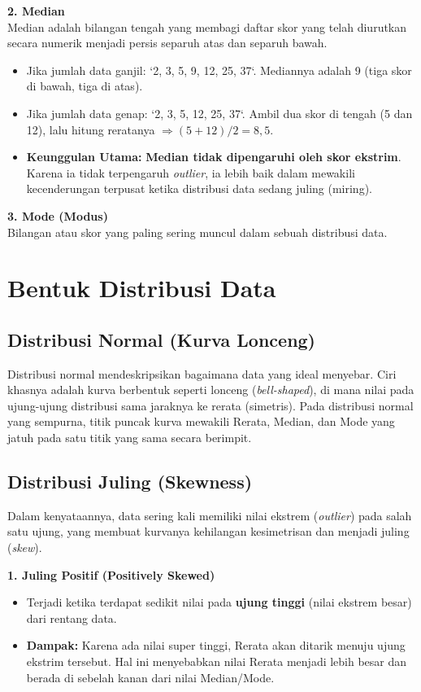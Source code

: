 \documentclass[12pt,a4paper]{article}
\begin{document}
\textbf{2. Median} \\
Median adalah bilangan tengah yang membagi daftar skor yang telah diurutkan secara numerik menjadi persis separuh atas dan separuh bawah.
\begin{itemize}
    \item Jika jumlah data ganjil: `2, 3, 5, 9, 12, 25, 37`. Mediannya adalah 9 (tiga skor di bawah, tiga di atas).
    \item Jika jumlah data genap: `2, 3, 5, 12, 25, 37`. Ambil dua skor di tengah (5 dan 12), lalu hitung reratanya $\Rightarrow (5+12)/2 = 8,5$.
    \item \textbf{Keunggulan Utama:} \textbf{Median tidak dipengaruhi oleh skor ekstrim}. Karena ia tidak terpengaruh \textit{outlier}, ia lebih baik dalam mewakili kecenderungan terpusat ketika distribusi data sedang juling (miring).
\end{itemize}

\textbf{3. Mode (Modus)} \\
Bilangan atau skor yang paling sering muncul dalam sebuah distribusi data.

\newpage
\section{Bentuk Distribusi Data}

\subsection{Distribusi Normal (Kurva Lonceng)}
Distribusi normal mendeskripsikan bagaimana data yang ideal menyebar. Ciri khasnya adalah kurva berbentuk seperti lonceng (\textit{bell-shaped}), di mana nilai pada ujung-ujung distribusi sama jaraknya ke rerata (simetris). Pada distribusi normal yang sempurna, titik puncak kurva mewakili Rerata, Median, dan Mode yang jatuh pada satu titik yang sama secara berimpit.

\subsection{Distribusi Juling (Skewness)}
Dalam kenyataannya, data sering kali memiliki nilai ekstrem (\textit{outlier}) pada salah satu ujung, yang membuat kurvanya kehilangan kesimetrisan dan menjadi juling (\textit{skew}).

\textbf{1. Juling Positif (Positively Skewed)}
\begin{itemize}
    \item Terjadi ketika terdapat sedikit nilai pada \textbf{ujung tinggi} (nilai ekstrem besar) dari rentang data.
    \item \textbf{Dampak:} Karena ada nilai super tinggi, Rerata akan ditarik menuju ujung ekstrim tersebut. Hal ini menyebabkan nilai Rerata menjadi lebih besar dan berada di sebelah kanan dari nilai Median/Mode.
\end{itemize}
\end{document}
